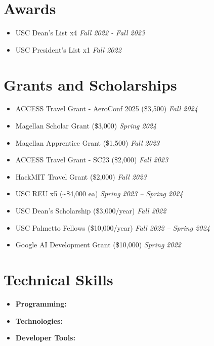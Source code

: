 \documentclass[letterpaper,11pt]{article}
\newcommand{\resumeItem}[1]{
  \item\small{
    {#1 \vspace{-2pt}}
  }
}
\newcommand{\resumeGrantHeading}[3]{
  \vspace{-2pt}\item
    #1 #2 \hfill \textit{#3} \\
}
\newcommand{\resumeAwardHeading}[2]{
  \vspace{-2pt}\item
    #1 \hfill \textit{#2} \\
}
\newcommand{\resumeSubItem}[1]{\resumeItem{#1}\vspace{-4pt}}
\newcommand{\resumeSubHeadingListStart}{\begin{itemize}[leftmargin=0.15in, label={}]}
\newcommand{\resumeSubHeadingListEnd}{\end{itemize}}
\begin{document}

\section{Awards}
  \vspace{2pt}
  \resumeSubHeadingListStart
    \resumeAwardHeading
      {USC Dean's List x4}{Fall 2022 - Fall 2023}
    \resumeAwardHeading
      {USC President's List x1}{Fall 2022}
    
  \resumeSubHeadingListEnd


\section{Grants and Scholarships}
  \resumeSubHeadingListStart
    \resumeGrantHeading{ACCESS Travel Grant - AeroConf 2025}{(\$3{,}500)}{Fall 2024}
    \resumeGrantHeading{Magellan Scholar Grant}{(\$3{,}000)}{Spring 2024}
    \resumeGrantHeading{Magellan Apprentice Grant}{(\$1{,}500)}{Fall 2023}
    \resumeGrantHeading{ACCESS Travel Grant - SC23}{(\$2{,}000)}{Fall 2023}
    \resumeGrantHeading{HackMIT Travel Grant}{(\$2{,}000)}{Fall 2023}
    \resumeGrantHeading{USC REU x5}{(\textasciitilde\$4{,}000 ea)}{Spring 2023 -- Spring 2024}
    \resumeGrantHeading{USC Dean's Scholarship}{(\$3{,}000/year)}{Fall 2022}
    \resumeGrantHeading{USC Palmetto Fellows}{(\$10{,}000/year)}{Fall 2022 -- Spring 2024}
    \resumeGrantHeading{Google AI Development Grant}{(\$10{,}000)}{Spring 2022}
    
  \resumeSubHeadingListEnd


\section{Technical Skills}
  \vspace{2pt}
  \resumeSubHeadingListStart
    \resumeSubItem{\textbf{Programming:}}{ C, C++, Java, Python, MATLAB, R, MySQL, VHDL}
    \resumeSubItem{\textbf{Technologies:}}{ ROS, RTOS, LoRaWAN, mmWave Studio, Intel Quartus, STM32Cube}
    \resumeSubItem{\textbf{Developer Tools:}}{ Docker, Kubernetes, Redis, Kafka, Altium, KiCad}
  \resumeSubHeadingListEnd

  \vspace{1pt}
\end{document}
